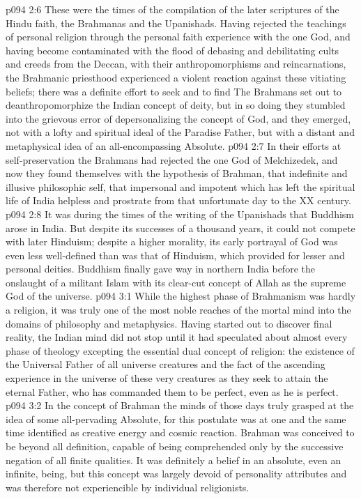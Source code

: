 \vs p094 2:6 \pc These were the times of the compilation of the later scriptures of the Hindu faith, the Brahmanas and the Upanishads. Having rejected the teachings of personal religion through the personal faith experience with the one God, and having become contaminated with the flood of debasing and debilitating cults and creeds from the Deccan, with their anthropomorphisms and reincarnations, the Brahmanic priesthood experienced a violent reaction against these vitiating beliefs; there was a definite effort to seek and to find  The Brahmans set out to deanthropomorphize the Indian concept of deity, but in so doing they stumbled into the grievous error of depersonalizing the concept of God, and they emerged, not with a lofty and spiritual ideal of the Paradise Father, but with a distant and metaphysical idea of an all\hyp{}encompassing Absolute.
\vs p094 2:7 In their efforts at self\hyp{}preservation the Brahmans had rejected the one God of Melchizedek, and now they found themselves with the hypothesis of Brahman, that indefinite and illusive philosophic self, that impersonal and impotent  which has left the spiritual life of India helpless and prostrate from that unfortunate day to the XX century.
\vs p094 2:8 \pc It was during the times of the writing of the Upanishads that Buddhism arose in India. But despite its successes of a thousand years, it could not compete with later Hinduism; despite a higher morality, its early portrayal of God was even less well\hyp{}defined than was that of Hinduism, which provided for lesser and personal deities. Buddhism finally gave way in northern India before the onslaught of a militant Islam with its clear\hyp{}cut concept of Allah as the supreme God of the universe.
\vs p094 3:1 While the highest phase of Brahmanism was hardly a religion, it was truly one of the most noble reaches of the mortal mind into the domains of philosophy and metaphysics. Having started out to discover final reality, the Indian mind did not stop until it had speculated about almost every phase of theology excepting the essential dual concept of religion: the existence of the Universal Father of all universe creatures and the fact of the ascending experience in the universe of these very creatures as they seek to attain the eternal Father, who has commanded them to be perfect, even as he is perfect.
\vs p094 3:2 In the concept of Brahman the minds of those days truly grasped at the idea of some all\hyp{}pervading Absolute, for this postulate was at one and the same time identified as creative energy and cosmic reaction. Brahman was conceived to be beyond all definition, capable of being comprehended only by the successive negation of all finite qualities. It was definitely a belief in an absolute, even an infinite, being, but this concept was largely devoid of personality attributes and was therefore not experiencible by individual religionists.

